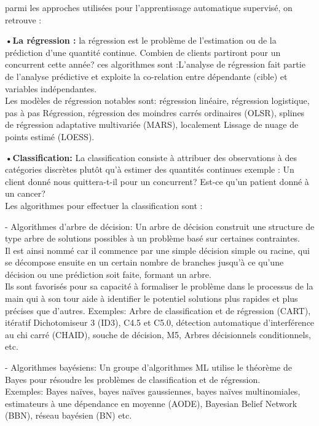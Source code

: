         parmi les approches utilisées pour l'apprentissage automatique supervisé, on retrouve :

        \textbf{•La régression :} la régression est le problème de l'estimation ou de la prédiction d'une quantité continue. Combien de clients partiront pour un concurrent cette année? 
        ces algorithmes sont :L'analyse de régression fait partie de l'analyse prédictive et exploite la co-relation entre dépendante (cible) et variables indépendantes.\\
        Les modèles de régression notables sont: régression linéaire, régression logistique, pas à pas
        Régression, régression des moindres carrés ordinaires (OLSR), splines de régression adaptative multivariée (MARS), localement Lissage de nuage de points estimé (LOESS).\cite{surveymachinelearningregression}

        \textbf{•Classification:}
        La classification consiste à attribuer des observations à des catégories discrètes plutôt qu'à estimer des quantités continues exemple : Un client donné nous quittera-t-il pour un concurrent? Est-ce qu'un patient donné à un cancer?\\
        Les algorithmes pour effectuer la classification sont :

        - Algorithmes d'arbre de décision: Un arbre de décision construit une structure de type arbre de solutions possibles à un problème basé sur certaines contraintes.\\ 
        Il est ainsi nommé car il commence par une simple décision simple ou racine, qui se décompose ensuite en un certain nombre de branches jusqu'à ce qu'une décision ou une prédiction soit faite, formant un arbre.\\
        Ils sont favorisés pour sa capacité à formaliser le problème dans le processus de la main qui à son tour aide à identifier le potentiel solutions plus rapides et plus précises que d'autres. Exemples: Arbre de classification et de régression (CART), itératif Dichotomiseur 3 (ID3), C4.5 et C5.0, détection automatique d'interférence au chi carré (CHAID), souche de décision, M5, Arbres décisionnels conditionnels, etc.\cite{surveymachinelearningclassification}

        - Algorithmes bayésiens: Un groupe d'algorithmes ML utilise le théorème de Bayes pour résoudre les problèmes de classification et de régression.\\
        Exemples: Bayes naïves, bayes naïves gaussiennes, bayes naïves multinomiales, estimateurs à une dépendance en moyenne (AODE), Bayesian Belief Network (BBN), réseau bayésien (BN) etc.\cite{surveymachinelearningclassification}

